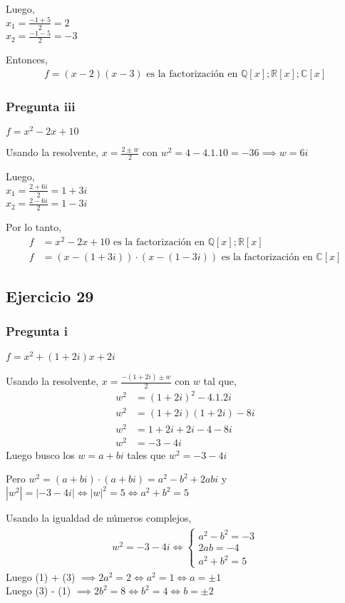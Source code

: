 Luego, \\
$ x_1 = \frac{-1+5}{2} = 2 $ \\
$ x_2 = \frac{-1-5}{2} = -3 $ 

Entonces,
\begin{align*}
    f = (x-2)(x-3) \text{ es la factorización en } \mathbb{Q}[x]; \mathbb{R}[x]; \mathbb{C}[x]
\end{align*}

\subsubsection{Pregunta iii}
$ f = x^2 - 2x + 10 $

Usando la resolvente, $ x = \frac{2 \pm w}{2} $ con $ w^2 = 4-4.1.10 = -36 \implies w = 6i$

Luego, \\
$ x_1 = \frac{2+6i}{2} = 1+3i $ \\
$ x_2 = \frac{2-6i}{2} = 1-3i $ 

Por lo tanto,
\begin{align*}
    f &= x^2 - 2x + 10 \text{ es la factorización en } \mathbb{Q}[x]; \mathbb{R}[x] \\
    f &= (x-(1+3i))\cdot (x-(1-3i)) \text{ es la factorización en } \mathbb{C}[x]
\end{align*}

\subsection{Ejercicio 29}
\subsubsection{Pregunta i}

$ f = x^2 + (1+2i)x + 2i $

Usando la resolvente, $ x = \frac{-(1+2i) \pm w}{2} $ con $w$ tal que,
\begin{align*}
    w^2 &= (1+2i)^2 - 4.1.2i \\
    w^2 &= (1+2i)(1+2i) - 8i \\
    w^2 &= 1+2i+2i-4 - 8i \\
    w^2 &= -3-4i
\end{align*}
Luego busco los $ w = a+bi $ tales que $ w^2 = -3-4i $

Pero $ w^2 = (a+bi) \cdot (a+bi) = a^2 - b^2 + 2abi $ y \\
$ |w^2| = |-3-4i| \iff |w|^2 = 5 \iff a^2 + b^2 = 5$

Usando la igualdad de números complejos,
\begin{align*}
    w^2 = -3-4i \iff \begin{cases}
        a^2 - b^2 = -3 \\
        2ab = -4 \\
        a^2 + b^2 = 5
    \end{cases}
\end{align*}
Luego (1) + (3) $ \implies 2a^2 = 2 \iff a^2 = 1 \iff a = \pm 1 $ \\
Luego (3) - (1) $ \implies 2b^2 = 8 \iff b^2 = 4 \iff b = \pm 2 $ \\

